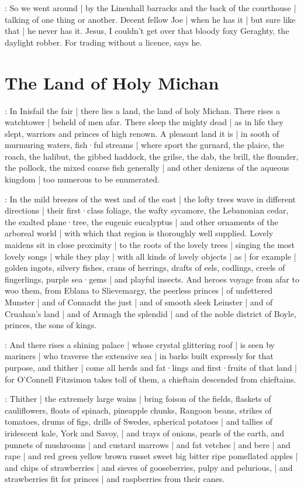 \Nq:
So we went around |
by the Linenhall barracks and the back of the courthouse |
talking of one thing or another.
Decent fellow Joe |
when he has it |
but sure like that |
he never has it.
Jesus,
I couldn't get over that bloody foxy Geraghty,
the daylight robber.
For trading without a licence,
says he.


\section{The Land of Holy Michan}

:
In Inisfail the fair |
there lies a land,
the land of holy Michan.
There rises a watchtower |
beheld of men afar.
There sleep the mighty dead |
as in life they slept,
warriors and princes of high renown.
A pleasant land it is |
in sooth of murmuring waters,
fish·ful streams |
where sport the gurnard,
the plaice,
the roach,
the halibut,
the gibbed haddock,
the grilse,
the dab,
the brill,
the flounder,
the pollock,
the mixed coarse fish generally |
and other denizens of the aqueous kingdom |
too numerous to be enumerated.

:
In the mild breezes of the west and of the east |
the lofty trees wave in different directions |
their first·class foliage,
the wafty sycamore,
the Lebanonian cedar,
the exalted plane·tree,
the eugenic eucalyptus |
and other ornaments of the arboreal world |
with which that region is thoroughly well supplied.
Lovely maidens sit in close proximity |
to the roots of the lovely trees |
singing the most lovely songs
 |
while they play |
with all kinds of lovely objects |
as |
for example |
golden ingots,
silvery fishes,
crans of herrings,
drafts of eels,
codlings,
creels of fingerlings,
purple sea·gems |
and playful insects.
And heroes voyage from afar to woo them,
from Eblana to Slievemargy,
the peerless princes |
of unfettered Munster |
and of Connacht the just |
and of smooth sleek Leinster |
and of Cruahan's land |
and of Armagh the splendid |
and of the noble district of Boyle,
princes,
the sons of kings.

:
And there rises a shining palace |
whose crystal glittering roof |
is seen by mariners |
who traverse the extensive sea |
in barks built expressly for that purpose,
and thither |
come all herds
and fat·lings
and first·fruits
of that land |
for O'Connell Fitzsimon takes toll of them,
a chieftain descended from chieftains.

:
Thither |
the extremely large wains |
bring foison of the fields,
flaskets of cauliflowers,
floats of spinach,
pineapple chunks,
Rangoon beans,
strikes of tomatoes,
drums of figs,
drills of Swedes,
spherical potatoes |
and tallies of iridescent kale,
York and Savoy, |
and trays of onions,
pearls of the earth,
and punnets of mushrooms |
and custard marrows |
and fat vetches |
and bere |
and rape |
and red green yellow brown russet sweet big bitter ripe pomellated apples |
and chips of strawberries |
and sieves of gooseberries,
pulpy and pelurious, |
and strawberries fit for princes |
and raspberries from their canes.


